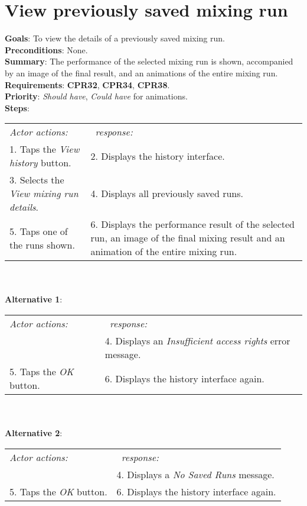 \section{View previously saved mixing run}
  \label{mixhist}
  \textbf{Goals}: To view the details of a previously saved mixing run.\\
  \textbf{Preconditions}: None.\\
  \textbf{Summary}: The performance of the selected mixing run is shown, accompanied by an image of the final result, and an animations of the entire mixing run.\\
  \textbf{Requirements}: \textbf{CPR32}, \textbf{CPR34}, \textbf{CPR38}.\\
  \textbf{Priority}: \emph{Should have}, \emph{Could have} for animations.\\
  \textbf{Steps}: \\
    \begin{tabular}{ p{} p{} }
  	\emph{Actor actions:} & \emph{\projectname\ response:} \\
    1. Taps the \emph{View history} button. & 2. Displays the history interface.\\
    3. Selects the \emph{View mixing run details}. & 4. Displays all previously saved runs.\\
    5. Taps one of the runs shown. & 6. Displays the performance result of the selected run, an image of the final mixing result and an animation of the entire mixing run. \\
    \end{tabular}
    \\
     \\\textbf{Alternative 1}: \\
    \begin{tabular}{ p{} p{} }
  	\emph{Actor actions:} & \emph{\projectname\ response:} \\
            & 4. Displays an \emph{Insufficient access rights} error message. \\
    5. Taps the \emph{OK} button. & 6. Displays the history interface again. \\
    \end{tabular}
        \\
     \\\textbf{Alternative 2}: \\
    \begin{tabular}{ p{} p{} }
  	\emph{Actor actions:} & \emph{\projectname\ response:} \\
            & 4. Displays a \emph{No Saved Runs} message. \\
    5. Taps the \emph{OK} button. & 6. Displays the history interface again. \\
    \end{tabular}

